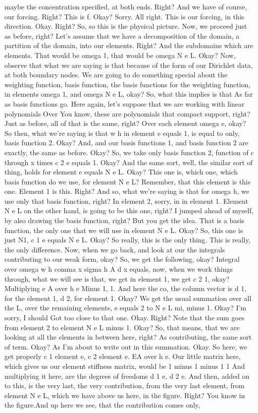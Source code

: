 \documentclass[10pt]{article}
\begin{document}
maybe the concentration specified, at both ends. Right? And we have of course, our forcing. Right? This is f. Okay?  Sorry. All right. This is our forcing, in this direction. Okay. Right? So, so this is the physical picture. Now, we proceed just as before, right? Let's assume that we have a decomposition of the domain, a partition of the domain, into our elements. Right? And the subdomains which are elements. That would be omega 1, that would be omega N e L. Okay? Now, observe that what we are saying is that because of the form of our Dirichlet data, at both boundary nodes. We are going to do something special about the weighting function, basis function, the basis functions for the weighting function, in elements omega 1, and omega N e L, okay? So, what this implies is that As far as basis functions go. Here again, let's suppose that we are working with linear polynomials Over You know, these are polynomials that compact support, right? Just as before, all of that is the same, right? Over each element omega e, okay? So then, what we're saying is that w h in element e equals 1, is equal to only, basis function 2. Okay? And, and our basis functions 1, and basis function 2 are exactly, the same as before. Okay? So, we take only basis function 2, function of c through x times c 2 e equals 1. Okay? And the same sort, well, the similar sort of thing, holds for element e equals N e L. Okay? This one is, which one, which basis function do we use, for element N e L? Remember, that this element is this one. Element 1 is this. Right? And so, what we're saying is that for omega h, we use only that basis function, right? In element 2, sorry, in in element 1. Element N e L on the other hand, is going to be this one, right? I jumped ahead of myself, by also drawing the basis function, right? But you get the idea. That is a basis function, the only one that we will use in element N e L. Okay? So, this one is just N1, c 1 e equals N e L. Okay? So really, this is the only thing. This is really, the only difference. Now, when we go back, and look at our the integrals contributing to our weak form, okay? So, we get the following, okay? Integral over omega w h comma x sigma h A d x equals, now, when we work things through, what we will see is that, we get in element 1, we get c 2 1, okay? Multiplying e A over h e Minus 1, 1. And here the co, the column vector is d 1, for the element 1, d 2, for element 1. Okay? We get the usual summation over all the L, over the remaining elements, e equals 2 to N e L mi, minus 1. Okay? I'm sorry, I should Got too close to that one. Okay. Right? Note that the sum goes from element 2 to element N e L minus 1. Okay? So, that means, that we are looking at all the elements in between here, right? As contributing, the same sort of term. Okay? As I'm about to write out in this summation. Okay. So here, we get properly c 1 element e, c 2 element e. EA over h e. Our little matrix here, which gives us our element stiffness matrix, would be 1 minus 1 minus 1 1 And multiplying it here, are the degrees of freedoms d 1 e, d 2 e. And then, added on to this, is the very last, the very contribution, from the very last element, from element N e L, which we have above us here, in the figure. Right?  You know in the figure.And up here we see, that the contribution comes only, 
\end{document}
